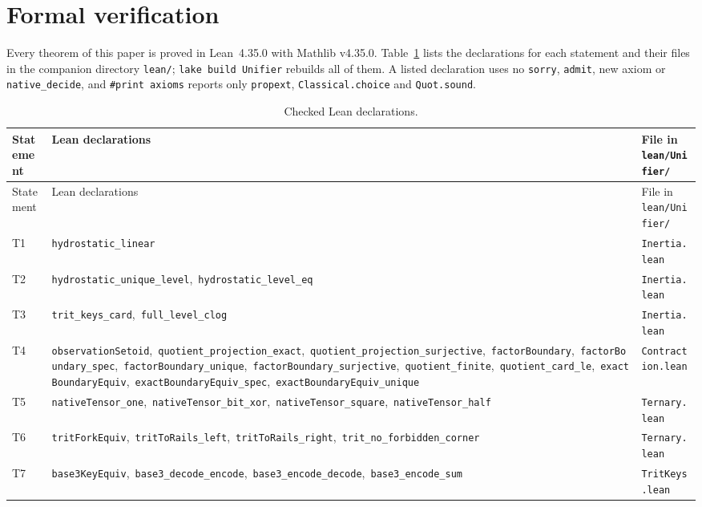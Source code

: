 \documentclass[11pt,a4paper]{article}
\theoremstyle{definition}
\begin{document}
\section{Formal verification}
Every theorem of this paper is proved in Lean~4.35.0 with Mathlib v4.35.0. Table~\ref{tab:lean} lists the declarations for each statement and their files in the companion directory \texttt{lean/}; \texttt{lake build Unifier} rebuilds all of them. A listed declaration uses no \texttt{sorry}, \texttt{admit}, new axiom or \texttt{native\_decide}, and \texttt{\#print axioms} reports only \texttt{propext}, \texttt{Classical.choice} and \texttt{Quot.sound}.
{\small
\begin{longtable}{@{}l>{\raggedright\arraybackslash}p{}l@{}}
\caption{Checked Lean declarations.}\label{tab:lean}\\
\toprule
Statement & Lean declarations & File in \texttt{lean/Unifier/}\\
\midrule
\endfirsthead
\toprule
Statement & Lean declarations & File in \texttt{lean/Unifier/}\\
\midrule
\endhead
\bottomrule
\endfoot
T1 & \texttt{hydrostatic\_linear} & \texttt{Inertia.lean}\\
T2 & \texttt{hydrostatic\_unique\_level},\allowbreak\ \texttt{hydrostatic\_level\_eq} & \texttt{Inertia.lean}\\
T3 & \texttt{trit\_keys\_card},\allowbreak\ \texttt{full\_level\_clog} & \texttt{Inertia.lean}\\
T4 & \texttt{observationSetoid},\allowbreak\ \texttt{quotient\_projection\_exact},\allowbreak\ \texttt{quotient\_projection\_surjective},\allowbreak\ \texttt{factorBoundary},\allowbreak\ \texttt{factorBoundary\_spec},\allowbreak\ \texttt{factorBoundary\_unique},\allowbreak\ \texttt{factorBoundary\_surjective},\allowbreak\ \texttt{quotient\_finite},\allowbreak\ \texttt{quotient\_card\_le},\allowbreak\ \texttt{exactBoundaryEquiv},\allowbreak\ \texttt{exactBoundaryEquiv\_spec},\allowbreak\ \texttt{exactBoundaryEquiv\_unique} & \texttt{Contraction.lean}\\
T5 & \texttt{nativeTensor\_one},\allowbreak\ \texttt{nativeTensor\_bit\_xor},\allowbreak\ \texttt{nativeTensor\_square},\allowbreak\ \texttt{nativeTensor\_half} & \texttt{Ternary.lean}\\
T6 & \texttt{tritForkEquiv},\allowbreak\ \texttt{tritToRails\_left},\allowbreak\ \texttt{tritToRails\_right},\allowbreak\ \texttt{trit\_no\_forbidden\_corner} & \texttt{Ternary.lean}\\
T7 & \texttt{base3KeyEquiv},\allowbreak\ \texttt{base3\_decode\_encode},\allowbreak\ \texttt{base3\_encode\_decode},\allowbreak\ \texttt{base3\_encode\_sum} & \texttt{TritKeys.lean}\\

\end{longtable}}
\end{document}

